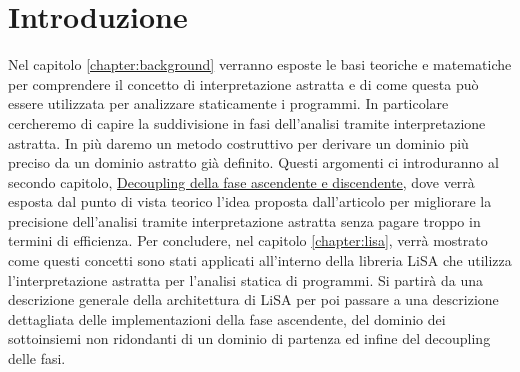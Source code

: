 \chapter*{Introduzione} %

Nel capitolo \ref{chapter:background} verranno esposte le basi teoriche e matematiche per comprendere il concetto di interpretazione astratta e di come questa può essere utilizzata per analizzare staticamente i programmi. In particolare cercheremo di capire la suddivisione in fasi dell'analisi tramite interpretazione astratta. In più daremo un metodo costruttivo per derivare un dominio più preciso da un dominio astratto già definito. Questi argomenti ci introduranno al secondo capitolo, \hyperref[chapter:decoupling]{Decoupling della fase ascendente e discendente}, dove verrà esposta dal punto di vista teorico l'idea proposta dall'articolo \cite{DBLP:conf/aplas/ArceriMZ22} per migliorare la precisione dell'analisi tramite interpretazione astratta senza pagare troppo in termini di efficienza. Per concludere, nel capitolo \ref{chapter:lisa}, verrà mostrato come questi concetti sono stati applicati all'interno della libreria LiSA che utilizza l'interpretazione astratta per l'analisi statica di programmi. Si partirà da una descrizione generale della architettura di LiSA per poi passare a una descrizione dettagliata delle implementazioni della fase ascendente, del dominio dei sottoinsiemi non ridondanti di un dominio di partenza ed infine del decoupling delle fasi.